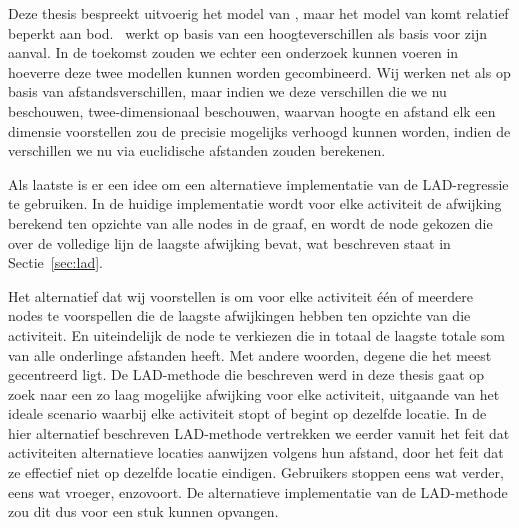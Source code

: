Deze thesis bespreekt uitvoerig het model van \citeauthor{Dhondt}, maar het
model van \citeauthor{Verdonck_2022} komt relatief beperkt aan bod.\
\citeauthor{Verdonck_2022} werkt op basis van een hoogteverschillen als basis
voor zijn aanval. In de toekomst zouden we echter een onderzoek kunnen voeren
in hoeverre deze twee modellen kunnen worden gecombineerd. Wij werken net als
\citeauthor{Dhondt} op basis van afstandsverschillen, maar indien we deze
verschillen die we nu beschouwen, twee-dimensionaal beschouwen, waarvan hoogte
en afstand elk een dimensie voorstellen zou de precisie mogelijks verhoogd
kunnen worden, indien de verschillen we nu via euclidische afstanden zouden
berekenen.

Als laatste is er een idee om een alternatieve implementatie van de
\ac{LAD}-regressie te gebruiken. In de huidige implementatie wordt voor elke
activiteit de afwijking berekend ten opzichte van alle nodes in de graaf, en
wordt de node gekozen die over de volledige lijn de laagste afwijking bevat,
wat beschreven staat in Sectie~\ref{sec:lad}.

Het alternatief dat wij voorstellen is om voor elke activiteit één of meerdere
nodes te voorspellen die de laagste afwijkingen hebben ten opzichte van die
activiteit. En uiteindelijk de node te verkiezen die in totaal de laagste
totale som van alle onderlinge afstanden heeft. Met andere woorden, degene die
het meest gecentreerd ligt. De \ac{LAD}-methode die beschreven werd in deze
thesis gaat op zoek naar een zo laag mogelijke afwijking voor elke activiteit,
uitgaande van het ideale scenario waarbij elke activiteit stopt of begint op
dezelfde locatie. In de hier alternatief beschreven \ac{LAD}-methode vertrekken
we eerder vanuit het feit dat activiteiten alternatieve locaties aanwijzen
volgens hun afstand, door het feit dat ze effectief niet op dezelfde locatie
eindigen. Gebruikers stoppen eens wat verder, eens wat vroeger, enzovoort. De
alternatieve implementatie van de \ac{LAD}-methode zou dit dus voor een stuk
kunnen opvangen.



